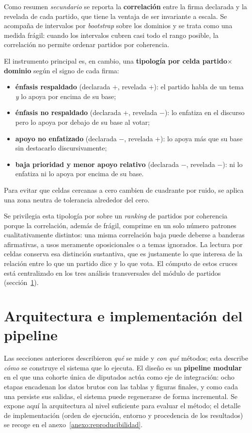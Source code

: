 Como resumen \emph{secundario} se reporta la \textbf{correlación} entre la firma
declarada y la revelada de cada partido, que tiene la ventaja de ser invariante a
escala. Se acompaña de intervalos por \emph{bootstrap} sobre los dominios y se
trata como una medida frágil: cuando los intervalos cubren casi todo el rango
posible, la correlación no permite ordenar partidos por coherencia.

El instrumento principal es, en cambio, una \textbf{tipología por celda
partido$\times$dominio} según el signo de cada firma:
\begin{itemize}
  \item \textbf{énfasis respaldado} (declarada $+$, revelada $+$): el partido
        habla de un tema \emph{y} lo apoya por encima de su base;
  \item \textbf{énfasis no respaldado} (declarada $+$, revelada $-$): lo enfatiza
        en el discurso pero lo apoya por debajo de su base al votar;
  \item \textbf{apoyo no enfatizado} (declarada $-$, revelada $+$): lo apoya más
        que su base sin destacarlo discursivamente;
  \item \textbf{baja prioridad y menor apoyo relativo} (declarada $-$,
        revelada $-$): ni lo enfatiza ni lo apoya por encima de su base.
\end{itemize}
Para evitar que celdas cercanas a cero cambien de cuadrante por ruido, se aplica
una zona neutra de tolerancia alrededor del cero.

Se privilegia esta tipología por sobre un \emph{ranking} de partidos por
coherencia porque la correlación, además de frágil, comprime en un solo número
patrones cualitativamente distintos: una misma correlación baja puede deberse a
banderas afirmativas, a usos meramente oposicionales o a temas ignorados. La
lectura por celdas conserva esa distinción sustantiva, que es justamente lo que
interesa de la relación entre lo que un partido dice y lo que vota. El cómputo de
estos cruces está centralizado en los tres análisis transversales del módulo de
partidos (sección~\ref{sec:arquitectura}).

\section{Arquitectura e implementación del pipeline}
\label{sec:arquitectura}

Las secciones anteriores describieron \emph{qué} se mide y \emph{con qué}
métodos; esta describe \emph{cómo} se construye el sistema que lo ejecuta. El
diseño es un \textbf{pipeline modular} en el que una cohorte única de diputados
actúa como eje de integración: ocho etapas encadenan los datos brutos con las
tablas y figuras finales, y como cada una persiste sus salidas, el sistema puede
regenerarse de forma incremental. Se expone aquí la arquitectura al nivel
suficiente para evaluar el método; el detalle de implementación (orden de
ejecución, entorno y procedencia de los resultados) se recoge en el
anexo~\ref{anexo:reproducibilidad}.

